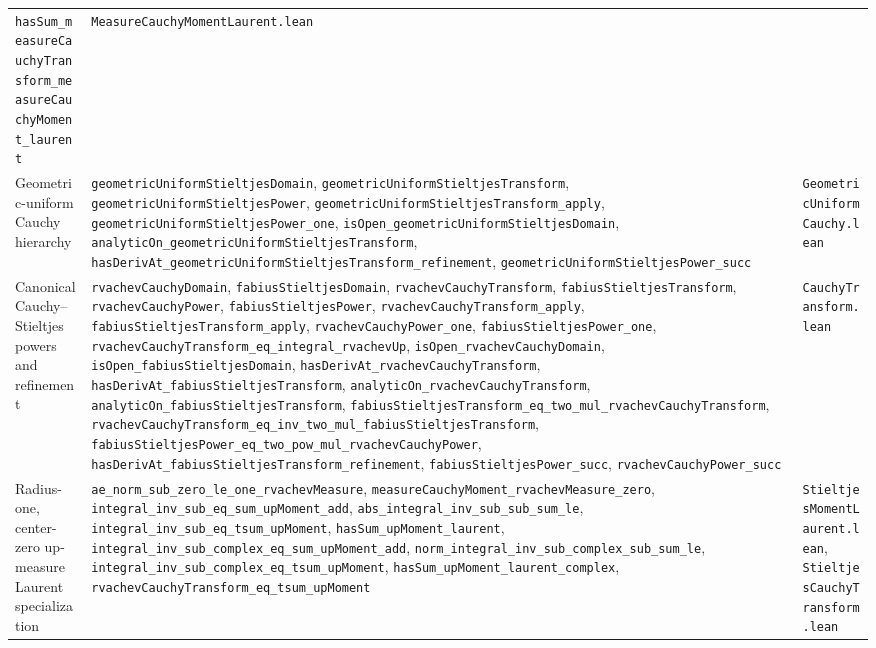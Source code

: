 \documentclass[11pt,oneside]{article}
\theoremstyle{definition}
\theoremstyle{remark}
\begin{document}
\begin{longtable}{@{}p{}p{}p{}@{}}
\nolinkurl{hasSum_measureCauchyTransform_measureCauchyMoment_laurent} &
\nolinkurl{MeasureCauchyMomentLaurent.lean} \\
Geometric-uniform Cauchy hierarchy &
\nolinkurl{geometricUniformStieltjesDomain},
\nolinkurl{geometricUniformStieltjesTransform},
\nolinkurl{geometricUniformStieltjesPower},
\nolinkurl{geometricUniformStieltjesTransform_apply},
\nolinkurl{geometricUniformStieltjesPower_one},
\nolinkurl{isOpen_geometricUniformStieltjesDomain},
\nolinkurl{analyticOn_geometricUniformStieltjesTransform},
\nolinkurl{hasDerivAt_geometricUniformStieltjesTransform_refinement},
\nolinkurl{geometricUniformStieltjesPower_succ} &
\nolinkurl{GeometricUniformCauchy.lean} \\
Canonical Cauchy--Stieltjes powers and refinement &
\nolinkurl{rvachevCauchyDomain}, \nolinkurl{fabiusStieltjesDomain},
\nolinkurl{rvachevCauchyTransform}, \nolinkurl{fabiusStieltjesTransform},
\nolinkurl{rvachevCauchyPower}, \nolinkurl{fabiusStieltjesPower},
\nolinkurl{rvachevCauchyTransform_apply},
\nolinkurl{fabiusStieltjesTransform_apply},
\nolinkurl{rvachevCauchyPower_one}, \nolinkurl{fabiusStieltjesPower_one},
\nolinkurl{rvachevCauchyTransform_eq_integral_rvachevUp},
\nolinkurl{isOpen_rvachevCauchyDomain}, \nolinkurl{isOpen_fabiusStieltjesDomain},
\nolinkurl{hasDerivAt_rvachevCauchyTransform},
\nolinkurl{hasDerivAt_fabiusStieltjesTransform},
\nolinkurl{analyticOn_rvachevCauchyTransform},
\nolinkurl{analyticOn_fabiusStieltjesTransform},
\nolinkurl{fabiusStieltjesTransform_eq_two_mul_rvachevCauchyTransform},
\nolinkurl{rvachevCauchyTransform_eq_inv_two_mul_fabiusStieltjesTransform},
\nolinkurl{fabiusStieltjesPower_eq_two_pow_mul_rvachevCauchyPower},
\nolinkurl{hasDerivAt_fabiusStieltjesTransform_refinement},
\nolinkurl{fabiusStieltjesPower_succ}, \nolinkurl{rvachevCauchyPower_succ} &
\nolinkurl{CauchyTransform.lean} \\
Radius-one, center-zero up-measure Laurent specialization &
\nolinkurl{ae_norm_sub_zero_le_one_rvachevMeasure},
\nolinkurl{measureCauchyMoment_rvachevMeasure_zero},
\nolinkurl{integral_inv_sub_eq_sum_upMoment_add},
\nolinkurl{abs_integral_inv_sub_sub_sum_le},
\nolinkurl{integral_inv_sub_eq_tsum_upMoment},
\nolinkurl{hasSum_upMoment_laurent},
\nolinkurl{integral_inv_sub_complex_eq_sum_upMoment_add},
\nolinkurl{norm_integral_inv_sub_complex_sub_sum_le},
\nolinkurl{integral_inv_sub_complex_eq_tsum_upMoment},
\nolinkurl{hasSum_upMoment_laurent_complex},
\nolinkurl{rvachevCauchyTransform_eq_tsum_upMoment} &
\nolinkurl{StieltjesMomentLaurent.lean},
\nolinkurl{StieltjesCauchyTransform.lean} \\

\end{longtable}
\end{document}
